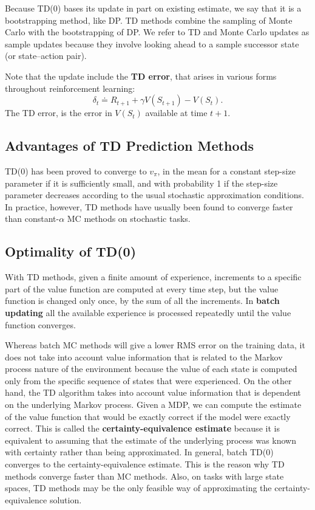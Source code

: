 \documentclass[11pt]{article}
\begin{document}
Because TD(0) bases its update in part on existing estimate, we say that it is a
bootstrapping method, like DP. TD methods combine the sampling of Monte Carlo
with the bootstrapping of DP. We refer to TD and Monte Carlo updates as sample
updates because they involve looking ahead to a sample successor state (or
state–action pair).

Note that the update include the \textbf{TD error}, that arises in various forms
throughout reinforcement learning:
\begin{equation}
\delta_t \doteq R_{t+1} + \gamma V(S_{t+1}) - V(S_{t}).
\end{equation}
The TD error, is the error in \(V(S_t)\) available at time \(t+1\).

\subsection{Advantages of TD Prediction Methods}
\label{sec:orgff98380}

TD(0) has been proved to converge to \(v_\pi\), in the mean for a constant
step-size parameter if it is sufficiently small, and with probability 1 if the
step-size parameter decreases according to the usual stochastic approximation
conditions. In practice, however, TD methods have usually been found to converge
faster than constant-\(\alpha\) MC methods on stochastic tasks.

\subsection{Optimality of TD(0)}
\label{sec:orgba50653}

With TD methods, given a finite amount of experience, increments to a specific
part of the value function are computed at every time step, but the value
function is changed only once, by the sum of all the increments. In \textbf{batch
updating} all the available experience is processed repeatedly until the value
function converges.

Whereas batch MC methods will give a lower RMS error on the training data, it
does not take into account value information that is related to the Markov
process nature of the environment because the value of each state is computed
only from the specific sequence of states that were experienced. On the other
hand, the TD algorithm takes into account value information that is dependent on
the underlying Markov process. Given a MDP, we can compute the estimate of the
value function that would be exactly correct if the model were exactly correct.
This is called the \textbf{certainty-equivalence estimate} because it is equivalent to
assuming that the estimate of the underlying process was known with certainty
rather than being approximated. In general, batch TD(0) converges to the
certainty-equivalence estimate. This is the reason why TD methods converge
faster than MC methods. Also, on tasks with large state spaces, TD methods may
be the only feasible way of approximating the certainty-equivalence solution.
\end{document}
